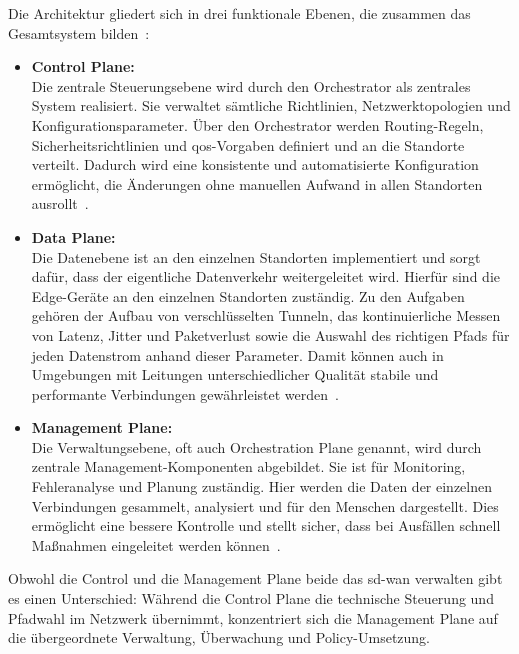 
Die Architektur gliedert sich in drei funktionale Ebenen, die zusammen das Gesamtsystem bilden~\cite[594]{segecSDWANArchitectureFunctions2020}:
\begin{itemize}
	\item \textbf{Control Plane:} \\
	Die zentrale Steuerungsebene wird durch den Orchestrator als zentrales System realisiert. Sie verwaltet sämtliche Richtlinien, Netzwerktopologien und Konfigurationsparameter. Über den Orchestrator werden Routing-Regeln, Sicherheitsrichtlinien und \ac{qos}-Vorgaben definiert und an die Standorte verteilt. Dadurch wird eine konsistente und automatisierte Konfiguration ermöglicht, die Änderungen ohne manuellen Aufwand in allen Standorten ausrollt~\cite[596]{segecSDWANArchitectureFunctions2020}.
	
	\item \textbf{Data Plane:} \\
	Die Datenebene ist an den einzelnen Standorten implementiert und sorgt dafür, dass der eigentliche Datenverkehr weitergeleitet wird. Hierfür sind die Edge-Geräte an den einzelnen Standorten zuständig. Zu den Aufgaben gehören der Aufbau von verschlüsselten Tunneln, das kontinuierliche Messen von Latenz, Jitter und Paketverlust sowie die Auswahl des richtigen Pfads für jeden Datenstrom anhand dieser Parameter. Damit können auch in Umgebungen mit Leitungen unterschiedlicher Qualität stabile und performante Verbindungen gewährleistet werden~\cite[595f]{segecSDWANArchitectureFunctions2020}.
	
	\item \textbf{Management Plane:} \\
	Die Verwaltungsebene, oft auch Orchestration Plane genannt, wird durch zentrale Management-Komponenten abgebildet. Sie ist für Monitoring, Fehleranalyse und Planung zuständig. Hier werden die Daten der einzelnen Verbindungen gesammelt, analysiert und für den Menschen dargestellt. Dies ermöglicht eine bessere Kontrolle und stellt sicher, dass bei Ausfällen schnell Maßnahmen eingeleitet werden können~\cite[596]{segecSDWANArchitectureFunctions2020}.
\end{itemize}
Obwohl die Control und die Management Plane beide das \ac{sd-wan} verwalten gibt es einen Unterschied: Während die Control Plane die technische Steuerung und Pfadwahl im Netzwerk übernimmt, konzentriert sich die Management Plane auf die übergeordnete Verwaltung, Überwachung und Policy-Umsetzung.

